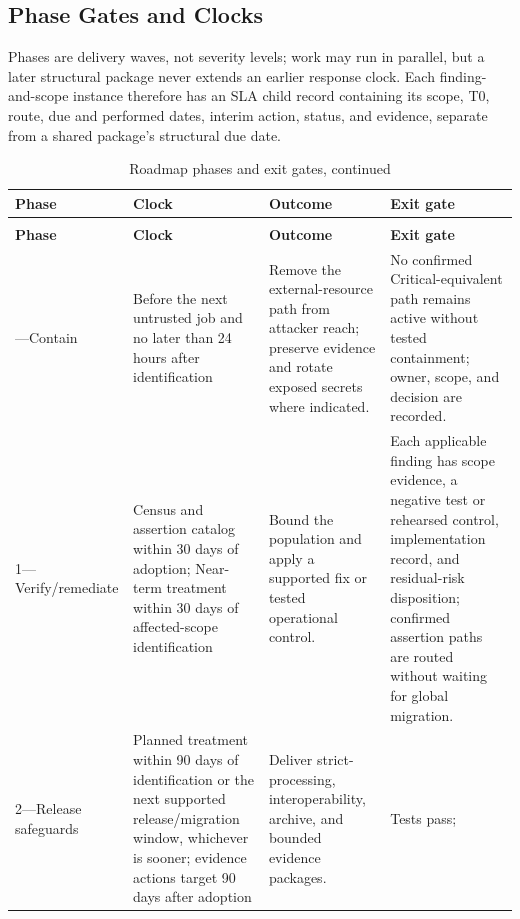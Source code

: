 \documentclass[../main.tex]{subfiles}
\begin{document}
\subsection{Phase Gates and Clocks}

Phases are delivery waves, not severity levels; work may run in parallel, but
a later structural package never extends an earlier response clock. Each
finding-and-scope instance therefore has an SLA child record containing its
scope, T0, route, due and performed dates, interim action, status, and evidence,
separate from a shared package's structural due date.

\begingroup
\small
\setlength{\tabcolsep}{3pt}
\renewcommand{\arraystretch}{1.1}
\setlength{\LTleft}{-0.8in}
\setlength{\LTright}{-0.8in}
\begin{longtable}{@{}p{0.14\widetablewidth}p{0.20\widetablewidth}p{0.27\widetablewidth}p{0.33\widetablewidth}@{}}
\caption{Roadmap phases and exit gates}
\label{tab:roadmap-phases}\\
\hline
\textbf{Phase} & \textbf{Clock} & \textbf{Outcome} & \textbf{Exit gate} \\
\hline
\endfirsthead
\caption[]{Roadmap phases and exit gates, continued}\\
\hline
\textbf{Phase} & \textbf{Clock} & \textbf{Outcome} & \textbf{Exit gate} \\
\hline
\endhead
\hline
\endfoot
\hline
\endlastfoot
0---Contain & Before the next untrusted job and no later than 24 hours after
identification & Remove the external-resource path from attacker reach;
preserve evidence and rotate exposed secrets where indicated. & No confirmed
Critical-equivalent path remains active without tested containment; owner,
scope, and decision are recorded. \\
1---Verify/remediate & Census and assertion catalog within 30 days of adoption;
Near-term treatment within 30 days of affected-scope identification & Bound the
population and apply a supported fix or tested operational control. & Each
applicable finding has scope evidence, a negative test or rehearsed control,
implementation record, and residual-risk disposition; confirmed assertion
paths are routed without waiting for global migration. \\
2---Release safeguards & Planned treatment within 90 days of identification or
the next supported release/migration window, whichever is sooner; evidence
actions target 90 days after adoption & Deliver strict-processing,
interoperability, archive, and bounded evidence packages. & Tests pass;

\end{longtable}
\end{document}
